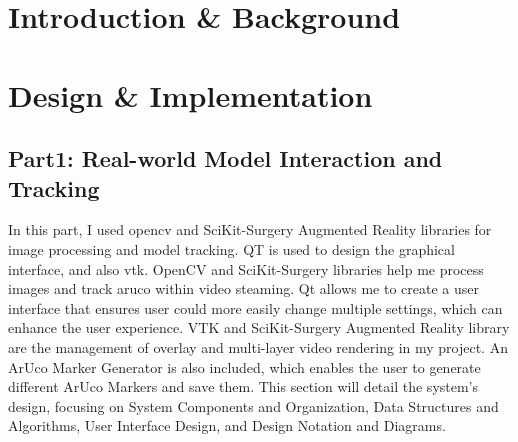\documentclass[12pt]{article}
\begin{document}
\section{Introduction \& Background}



\section{Design \& Implementation}

\subsection{Part1: Real-world Model Interaction and Tracking}

In this part, I used \gls{opencv}\cite{opencv_library} and SciKit-Surgery Augmented Reality\cite{Thompson_SciKit-Surgery_Compact_Libraries_2020} libraries for image
processing and  model tracking. \gls{QT}\cite{QtWebsite} is used to design the graphical interface, and also \gls{vtk}\cite{vtkBook}. OpenCV and SciKit-Surgery libraries help me process images
and track \gls{aruco}\cite{1467495} within video steaming. Qt allows me to create a user interface that ensures  user could more easily change multiple settings, which can enhance the user experience.
VTK and SciKit-Surgery Augmented Reality library are the management of overlay and multi-layer video rendering in my project.
An ArUco Marker Generator is also included, which enables the user to generate different ArUco Markers and save them.
This section will detail the system's design, focusing on System Components and Organization, Data Structures and Algorithms,
User Interface Design, and Design Notation and Diagrams.
\end{document}
